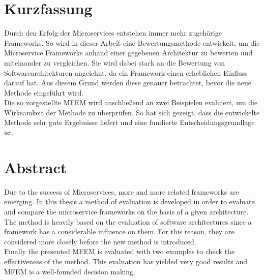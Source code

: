 \onehalfspacing
{}
\section{Kurzfassung}
Durch den Erfolg der Microservices entstehen immer mehr zugehörige Frameworks. So wird in dieser Arbeit eine Bewertungsmethode entwickelt, um die Microservice Frameworks anhand einer gegebenen Architektur zu bewerten und miteinander zu vergleichen. Sie wird dabei stark an die Bewertung von Softwarearchitekturen angelehnt, da ein Framework einen erheblichen Einfluss darauf hat. Aus diesem Grund werden diese genauer betrachtet, bevor die neue Methode eingeführt wird.\\
Die so vorgestellte \acf*{MFEM} wird anschließend an zwei Beispielen evaluiert, um die Wirksamkeit der Methode zu überprüfen. So hat sich gezeigt, dass die entwickelte Methode sehr gute Ergebnisse liefert und eine fundierte Entscheidungsgrundlage ist.  

\vspace{-1,2em}
\section*{Abstract}
Due to the success of Microservices, more and more related frameworks are emerging. In this thesis a method of evaluation is developed in order to evaluate and compare the microservice frameworks on the basis of a given architecture. The method is heavily based on the evaluation of software architectures since a framework has a considerable influence on them. For this reason, they are considered more closely before the new method is introduced.\\
Finally the presented \acf*{MFEM} is evaluated with two examples to check the effectiveness of the method. This evaluation has yielded very good results and \acs*{MFEM} is a well-founded decision making.